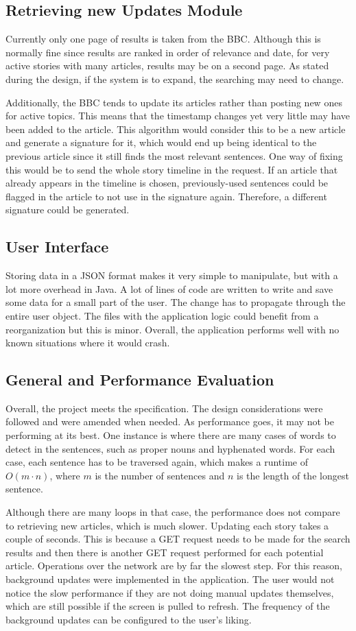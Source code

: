 \documentclass[11pt,titlepage]{report}
\begin{document}
\subsection{Retrieving new Updates Module}
Currently only one page of results is taken from the BBC. Although this is normally fine since results are ranked in order of relevance and date, for very active stories with many articles, results may be on a second page. As stated during the design, if the system is to expand, the searching may need to change.

Additionally, the BBC tends to update its articles rather than posting new ones for active topics. This means that the timestamp changes yet very little may have been added to the article. This algorithm would consider this to be a new article and generate a signature for it, which would end up being identical to the previous article since it still finds the most relevant sentences. One way of fixing this would be to send the whole story timeline in the request. If an article that already appears in the timeline is chosen, previously-used sentences could be flagged in the article to not use in the signature again. Therefore, a different signature could be generated.
\subsection{User Interface}
Storing data in a JSON format makes it very simple to manipulate, but with a lot more overhead in Java. A lot of lines of code are written to write and save some data for a small part of the user. The change has to propagate through the entire user object. The files with the application logic could benefit from a reorganization but this is minor. Overall, the application performs well with no known situations where it would crash.
\subsection{General and Performance Evaluation}
Overall, the project meets the specification. The design considerations were followed and were amended when needed. As performance goes, it may not be performing at its best. One instance is where there are many cases of words to detect in the sentences, such as proper nouns and hyphenated words. For each case, each sentence has to be traversed again, which makes a runtime of $O(m \cdot n)$, where $m$ is the number of sentences and $n$ is the length of the longest sentence.

Although there are many loops in that case, the performance does not compare to retrieving new articles, which is much slower. Updating each story takes a couple of seconds. This is because a GET request needs to be made for the search results and then there is another GET request performed for each potential article. Operations over the network are by far the slowest step. For this reason, background updates were implemented in the application. The user would not notice the slow performance if they are not doing manual updates themselves, which are still possible if the screen is pulled to refresh. The frequency of the background updates can be configured to the user's liking.
\end{document}
